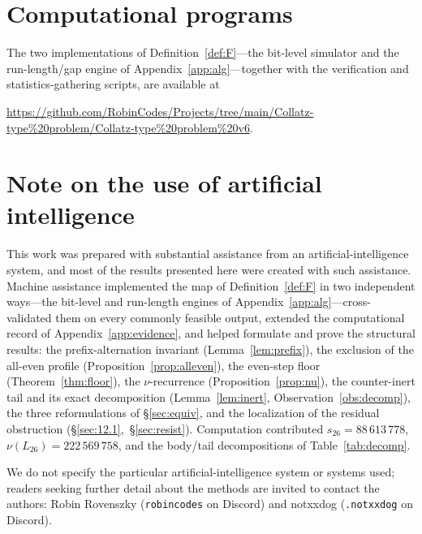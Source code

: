 \documentclass[11pt,reqno]{amsart}
\theoremstyle{plain}
\theoremstyle{definition}
\theoremstyle{remark}
\begin{document}
\section{Computational programs}\label{app:programs}
The two implementations of Definition~\ref{def:F}---the bit-level simulator and the run-length/gap engine of Appendix~\ref{app:alg}---together with the verification and statistics-gathering scripts, are available at
\begin{center}
\url{https://github.com/RobinCodes/Projects/tree/main/Collatz-type%20problem/Collatz-type%20problem%20v6}.
\end{center}

\section{Note on the use of artificial intelligence}\label{app:ai}
This work was prepared with substantial assistance from an artificial-intelligence system, and most of the results presented here were created with such assistance. Machine assistance implemented the map of Definition~\ref{def:F} in two independent ways---the bit-level and run-length engines of Appendix~\ref{app:alg}---cross-validated them on every commonly feasible output, extended the computational record of Appendix~\ref{app:evidence}, and helped formulate and prove the structural results: the prefix-alternation invariant (Lemma~\ref{lem:prefix}), the exclusion of the all-even profile (Proposition~\ref{prop:alleven}), the even-step floor (Theorem~\ref{thm:floor}), the $\nu$-recurrence (Proposition~\ref{prop:nu}), the counter-inert tail and its exact decomposition (Lemma~\ref{lem:inert}, Observation~\ref{obs:decomp}), the three reformulations of \S\ref{sec:equiv}, and the localization of the residual obstruction (\S\ref{sec:12.1},~\S\ref{sec:resist}). Computation contributed $s_{26}=88\,613\,778$, $\nu(L_{26})=222\,569\,758$, and the body/tail decompositions of Table~\ref{tab:decomp}.

We do not specify the particular artificial-intelligence system or systems used; readers seeking further detail about the methods are invited to contact the authors: Robin Rovenszky (\texttt{robincodes} on Discord) and notxxdog (\texttt{.notxxdog} on Discord).
\end{document}
